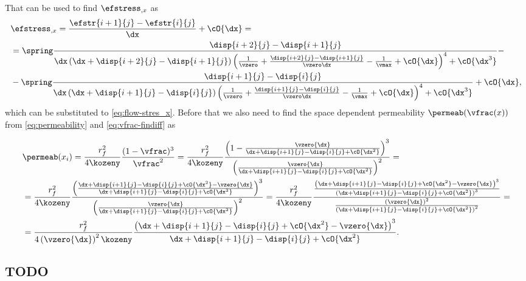 \documentclass[twoside,a4paper,12pt]{article}
\begin{document}
That can be used to find $\efstress_{,x}$ as
%
\begin{align}
  &\efstress_{,x} = \frac{\efstr{i+1}{j} - \efstr{i}{j}}{\dx} + \cO{\dx}= \nonumber \\
  &=
  \spring
   \frac{\disp{i+2}{j} - \disp{i+1}{j}}{{\dx}\left(\dx + \disp{i+2}{j} - \disp{i+1}{j}\right){\left(\frac{1}{\vzero} + \frac{\disp{i+2}{j} - \disp{i+1}{j}}{\vzero\dx} -\frac{1}{\vmax}  + \cO{\dx}\right)^4} + \cO{\dx^3}}- \nonumber\\ 
  &-\spring
  \frac{\disp{i+1}{j} - \disp{i}{j}}{{\dx}\left(\dx + \disp{i+1}{j} - \disp{i}{j}\right){\left(\frac{1}{\vzero} + \frac{\disp{i+1}{j} - \disp{i}{j}}{\vzero\dx} -\frac{1}{\vmax}  + \cO{\dx}\right)^4} + \cO{\dx^3}}%
   + \cO{\dx},
\end{align}
%
which can be substituted to \eqref{eq:flow-stres_x}. Before that we
also need to find the space dependent permeability
$\permeab(\vfrac(x))$ from \eqref{eq:permeability}  and \eqref{eq:vfrac-findiff} as

\begin{align}
  &\permeab(x_i) = \frac{r_f^2}{4\kozeny} \frac{(1-\vfrac)^3}{\vfrac^2}=
    \frac{r_f^2}{4\kozeny} \frac{\left(1-\frac{\vzero{\dx}}{{\dx + \disp{i+1}{j} - \disp{i}{j} + \cO{\dx^2}}}\right)^3}{\left(\frac{\vzero{\dx}}{{\dx + \disp{i+1}{j} - \disp{i}{j} + \cO{\dx^2}}}\right)^2}=\nonumber \\
  &=\frac{r_f^2}{4\kozeny} \frac{\left(\frac{{\dx + \disp{i+1}{j} - \disp{i}{j} + \cO{\dx^2}}-\vzero{\dx}}{{\dx + \disp{i+1}{j} - \disp{i}{j} + \cO{\dx^2}}}\right)^3}{\left(\frac{\vzero{\dx}}{{\dx + \disp{i+1}{j} - \disp{i}{j} + \cO{\dx^2}}}\right)^2}
    =\frac{r_f^2}{4\kozeny} \frac{\frac{\left({\dx + \disp{i+1}{j} - \disp{i}{j} + \cO{\dx^2}}-\vzero{\dx}\right)^3}{\left({\dx + \disp{i+1}{j} - \disp{i}{j} + \cO{\dx^2}}\right)^3}}{\frac{\left(\vzero{\dx}\right)^2}{\left({\dx + \disp{i+1}{j} - \disp{i}{j} + \cO{\dx^2}}\right)^2}}=\nonumber \\
  &  =\frac{r_f^2}{4\left(\vzero{\dx}\right)^2\kozeny} {\frac{\left({\dx + \disp{i+1}{j} - \disp{i}{j} + \cO{\dx^2}}-\vzero{\dx}\right)^3}{{\dx + \disp{i+1}{j} - \disp{i}{j} + \cO{\dx^2}}}}.
\end{align}



\subsection{TODO}
\end{document}
